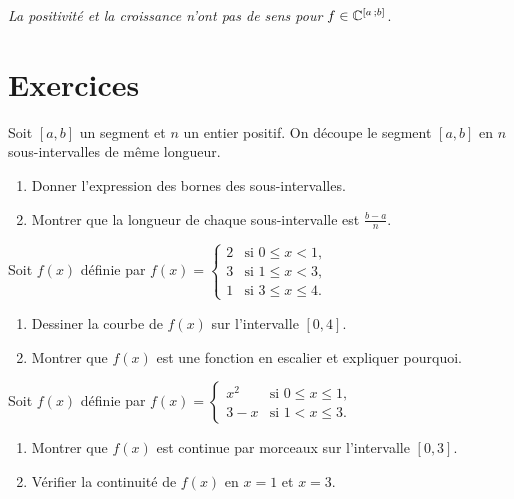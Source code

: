 \danger \emph{La positivité et la croissance n'ont pas de sens pour \(f \in 
\mathbb{C}^{\left[ a \, ; {} b \right]}\)}.
\section{Exercices}
\begin{exercice}
Soit \( [a, b] \) un segment et \( n \) un entier positif. On découpe le segment \( [a, b] \) en \( n \) sous-intervalles de même longueur.
\begin{enumerate}
    \item Donner l'expression des bornes des sous-intervalles.
    \item Montrer que la longueur de chaque sous-intervalle est \( \frac{b-a}{n} \).
\end{enumerate}
\end{exercice}

\begin{exercice}
Soit \( f(x) \) définie par \( f(x) = \begin{cases}
2 & \text{si } 0 \leq x < 1, \\
3 & \text{si } 1 \leq x < 3, \\
1 & \text{si } 3 \leq x \leq 4.
\end{cases} \)
\begin{enumerate}
    \item Dessiner la courbe de \( f(x) \) sur l'intervalle \( [0, 4] \).
    \item Montrer que \( f(x) \) est une fonction en escalier et expliquer pourquoi.
\end{enumerate}
\end{exercice}

\begin{exercice}
Soit \( f(x) \) définie par \( f(x) = \begin{cases}
x^2 & \text{si } 0 \leq x \leq 1, \\
3 - x & \text{si } 1 < x \leq 3.
\end{cases} \)
\begin{enumerate}
    \item Montrer que \( f(x) \) est continue par morceaux sur l'intervalle \( [0, 3] \).
    \item Vérifier la continuité de \( f(x) \) en \( x = 1 \) et \( x = 3 \).
\end{enumerate}
\end{exercice}

